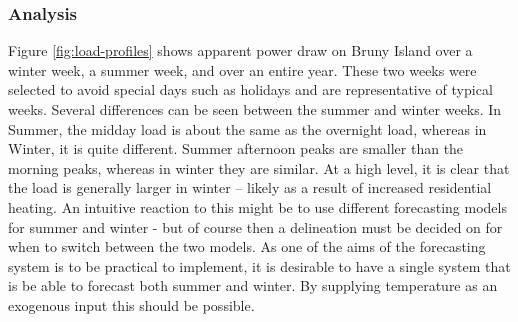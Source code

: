 \subsubsection{Analysis}
Figure \ref{fig:load-profiles} shows apparent power draw on Bruny Island over a winter week, a summer week, and over an entire year.
These two weeks were selected to avoid special days such as holidays and are representative of typical weeks.
Several differences can be seen between the summer and winter weeks.
In Summer, the midday load is about the same as the overnight load, whereas in Winter, it is quite different.
Summer afternoon peaks are smaller than the morning peaks, whereas in winter they are similar.
At a high level, it is clear that the load is generally larger in winter -- likely as a result of increased residential heating.
An intuitive reaction to this might be to use different forecasting models for summer and winter - but of course then a delineation must be decided on for when to switch between the two models.
As one of the aims of the forecasting system is to be practical to implement, it is desirable to have a single system that is be able to forecast both summer and winter.
By supplying temperature as an exogenous input this should be possible.

